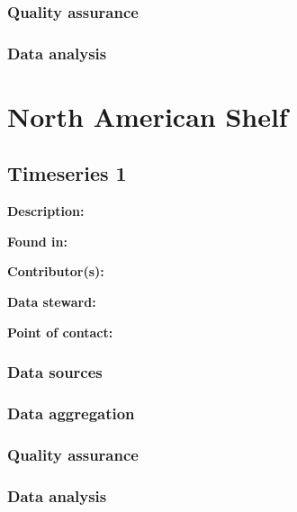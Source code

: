 \documentclass[
]{book}
\begin{document}
\hypertarget{quality-assurance-1}{%
\subsection{Quality assurance}\label{quality-assurance-1}}

\hypertarget{data-analysis-1}{%
\subsection{Data analysis}\label{data-analysis-1}}

\hypertarget{north-american-shelf}{%
\chapter{North American Shelf}\label{north-american-shelf}}

\hypertarget{timeseries-1-2}{%
\section{Timeseries 1}\label{timeseries-1-2}}

\textbf{Description:}

\textbf{Found in:}

\textbf{Contributor(s):}

\textbf{Data steward:}

\textbf{Point of contact:}

\hypertarget{data-sources-2}{%
\subsection{Data sources}\label{data-sources-2}}

\hypertarget{data-aggregation-2}{%
\subsection{Data aggregation}\label{data-aggregation-2}}

\hypertarget{quality-assurance-2}{%
\subsection{Quality assurance}\label{quality-assurance-2}}

\hypertarget{data-analysis-2}{%
\subsection{Data analysis}\label{data-analysis-2}}
\end{document}
